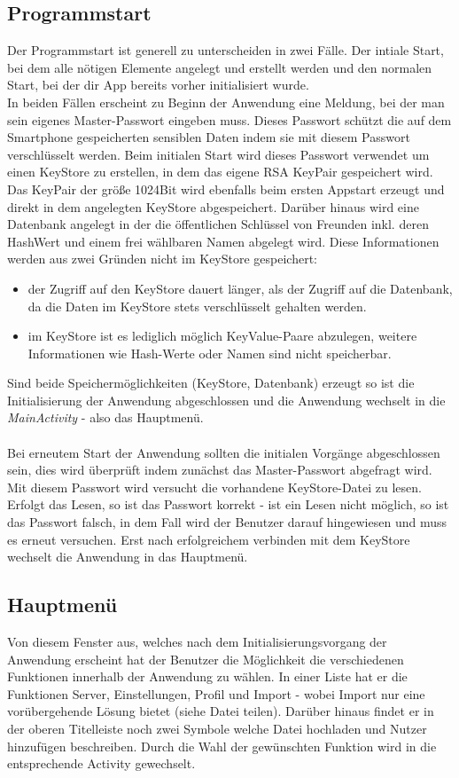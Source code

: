 \documentclass[10pt, a4paper,headsepline]{scrreprt}
\begin{document}
\subsection{Programmstart}
Der Programmstart ist generell zu unterscheiden in zwei Fälle. Der intiale Start, bei dem alle nötigen Elemente angelegt und erstellt werden und den normalen Start, bei der dir App bereits vorher initialisiert wurde. \\
In beiden Fällen erscheint zu Beginn der Anwendung eine Meldung, bei der man sein eigenes Master-Passwort eingeben muss. Dieses Passwort schützt die auf dem Smartphone gespeicherten sensiblen Daten indem sie mit diesem Passwort verschlüsselt werden. Beim initialen Start wird dieses Passwort verwendet um einen KeyStore zu erstellen, in dem das eigene RSA KeyPair gespeichert wird. Das KeyPair der größe 1024Bit wird ebenfalls beim ersten Appstart erzeugt und direkt in dem angelegten KeyStore abgespeichert. Darüber hinaus wird eine Datenbank angelegt in der die öffentlichen Schlüssel von Freunden inkl. deren HashWert und einem frei wählbaren Namen abgelegt wird. Diese Informationen werden aus zwei Gründen nicht im KeyStore gespeichert:
\begin{itemize}
\item der Zugriff auf den KeyStore dauert länger, als der Zugriff auf die Datenbank, da die Daten im KeyStore stets verschlüsselt gehalten werden.
\item im KeyStore ist es lediglich möglich KeyValue-Paare abzulegen, weitere Informationen wie Hash-Werte oder Namen sind nicht speicherbar.
\end{itemize}
Sind beide Speichermöglichkeiten (KeyStore, Datenbank) erzeugt so ist die Initialisierung der Anwendung abgeschlossen und die Anwendung wechselt in die \textit{MainActivity} - also das Hauptmenü.\\ \\
Bei erneutem Start der Anwendung sollten die initialen Vorgänge abgeschlossen sein, dies wird überprüft indem zunächst das Master-Passwort abgefragt wird. Mit diesem Passwort wird versucht die vorhandene KeyStore-Datei zu lesen. Erfolgt das Lesen, so ist das Passwort korrekt - ist ein Lesen nicht möglich, so ist das Passwort falsch, in dem Fall wird der Benutzer darauf hingewiesen und muss es erneut versuchen. Erst nach erfolgreichem verbinden mit dem KeyStore wechselt die Anwendung in das Hauptmenü.


\subsection{Hauptmenü}
Von diesem Fenster aus, welches nach dem Initialisierungsvorgang der Anwendung erscheint hat der Benutzer die Möglichkeit die verschiedenen Funktionen innerhalb der Anwendung zu wählen. In einer Liste hat er die Funktionen Server, Einstellungen, Profil und Import - wobei Import nur eine vorübergehende Lösung bietet  (siehe Datei teilen). Darüber hinaus findet er in der oberen Titelleiste noch zwei Symbole welche Datei hochladen und Nutzer hinzufügen beschreiben. Durch die Wahl der gewünschten Funktion wird in die entsprechende Activity gewechselt.
\end{document}
